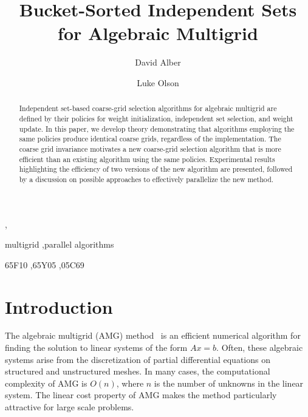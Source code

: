 \documentclass{elsart}
\begin{document}
\begin{frontmatter}


\title{Bucket-Sorted Independent Sets for Algebraic Multigrid}
\author[NREL]{David Alber},
\author[UIUC]{Luke Olson}
\address[NREL]{Scientific Computing Center\\ National Renewable Energy Laboratory}
\address[UIUC]{Department of Computer Science\\ University of Illinois at Urbana-Champaign}

\begin{abstract} Independent set-based coarse-grid selection algorithms for
algebraic multigrid are defined by their policies for weight initialization,
independent set selection, and weight update. In this paper, we develop theory
demonstrating that algorithms employing the same policies produce identical
coarse grids, regardless of the implementation. The coarse grid invariance
motivates a new coarse-grid selection algorithm that is more efficient than an
existing algorithm using the same policies. Experimental results highlighting
the efficiency of two versions of the new algorithm are presented, followed by a
discussion on possible approaches to effectively parallelize the new method.
\end{abstract}

\begin{keyword}
multigrid \sep parallel algorithms

\MSC 65F10 \sep 65Y05 \sep 05C69
\end{keyword}
\end{frontmatter}

\section{Introduction}
\label{sec:intro}
The algebraic multigrid (AMG) method~\cite{Ruge1987,Brandt1982} is an
efficient numerical algorithm for finding the solution to
linear systems of the form $Ax = b$.  Often, these algebraic systems arise from
the discretization of partial differential equations on structured and
unstructured meshes. In many cases, the computational complexity of
AMG is $O(n)$, where $n$ is the number of unknowns in the linear
system. The linear cost property of AMG makes the method particularly
attractive for large scale problems.
\end{document}
